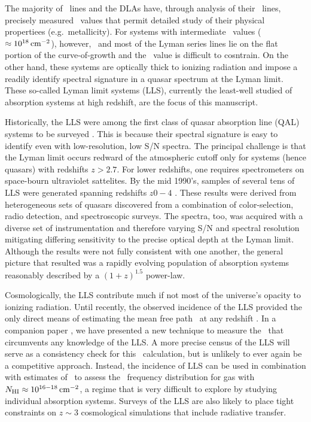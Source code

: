 \documentclass[12pt,preprint]{aastex}
\begin{document}
The majority of \lyaf\ lines and the DLAs have, through
analysis of their \lya\ lines, precisely measured \nhi\ values
that permit detailed study of their physical propertiees (e.g.\ metallicity).
For systems with intermediate \nhi\ values ($\approx 10^{18} \, {\rm cm^{-2}}$),
however, \lya\ and most of the Lyman series lines lie on the
flat portion of the curve-of-growth and the \nhi\ value is difficult
to cosntrain.
On the other hand, these systems are optically thick to ionizing
radiation and impose a readily identify spectral signature in a quasar
spectrum at the Lyman limit.
These so-called Lyman limit systems (LLS), currently the least-well
studied of  absorption systems at high redshift,
are the focus of this manuscript.

Historically, the LLS were among the first class of quasar
absorption line (QAL) systems to be surveyed \citep{tytler84}.
This is because their spectral signature is easy to identify
even with low-resolution, low S/N spectra.  The principal challenge
is that the Lyman limit occurs redward of the atmospheric
cutoff only for systems (hence quasars) with redshifts $z>2.7$.
For lower redshifts, one requires spectrometers on space-bourn
ultraviolet sattelites.
By the mid 1990's, samples of several tens of LLS were generated
spanning redshifts $z 0 - 4$ \citep{ssb89,lzt9X,stengler95,storrie96}.
These results were derived from heterogeneous sets of quasars discovered
from a combination of color-selection, radio detection, and
spectroscopic surveys.    The spectra, too, was acquired with a 
diverse set of instrumentation and therefore varying S/N and spectral
resolution mitigating differing sensitivity to the precise optical
depth at the Lyman limit.  Although the results were not fully
consistent with one another, the general picture that resulted
was a rapidly evolving population of absorption systems reasonably
described by a $(1+z)^{1.5}$ power-law.

Cosmologically, the LLS contribute much if not most of the universe's
opacity to ionizing radiation.  Until recently, the observed incidence
of the LLS provided the only direct means of estimating the mean
free path \lmfp\ at any redshift \citep[e.g.][]{meiksin,madau99,fg08b}.
In a companion paper \citep{pwo09}, we have presented a new
technique to measure the \lmfp\ that circumvents any knowledge
of the LLS.  A more precise census of the LLS will serve as a 
consistency check for this \lmfp\ calculation, but is unlikely to
ever again be a competitive approach.  Instead, the incidence of LLS
can be used in combination with estimates of \lmfp\ to assess the
\nhi\ frequency distribution for gas 
with $N_{\rm HI} \approx 10^{16-18} \, {\rm cm^{-2}}$, 
a regime that is very difficult to explore by studying individual
absorption systems.   Surveys of the LLS are also likely to 
place tight constraints on $z \sim 3$
cosmological simulations that include radiative transfer.
\end{document}
